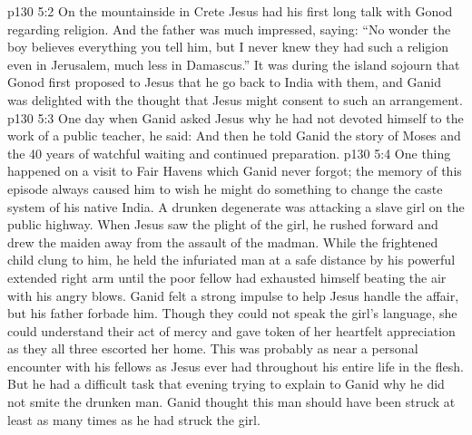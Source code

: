 \vs p130 5:2 On the mountainside in Crete Jesus had his first long talk with Gonod regarding religion. And the father was much impressed, saying: “No wonder the boy believes everything you tell him, but I never knew they had such a religion even in Jerusalem, much less in Damascus.” It was during the island sojourn that Gonod first proposed to Jesus that he go back to India with them, and Ganid was delighted with the thought that Jesus might consent to such an arrangement.
\vs p130 5:3 One day when Ganid asked Jesus why he had not devoted himself to the work of a public teacher, he said:  And then he told Ganid the story of Moses and the 40 years of watchful waiting and continued preparation.
\vs p130 5:4 One thing happened on a visit to Fair Havens which Ganid never forgot; the memory of this episode always caused him to wish he might do something to change the caste system of his native India. A drunken degenerate was attacking a slave girl on the public highway. When Jesus saw the plight of the girl, he rushed forward and drew the maiden away from the assault of the madman. While the frightened child clung to him, he held the infuriated man at a safe distance by his powerful extended right arm until the poor fellow had exhausted himself beating the air with his angry blows. Ganid felt a strong impulse to help Jesus handle the affair, but his father forbade him. Though they could not speak the girl’s language, she could understand their act of mercy and gave token of her heartfelt appreciation as they all three escorted her home. This was probably as near a personal encounter with his fellows as Jesus ever had throughout his entire life in the flesh. But he had a difficult task that evening trying to explain to Ganid why he did not smite the drunken man. Ganid thought this man should have been struck at least as many times as he had struck the girl.
